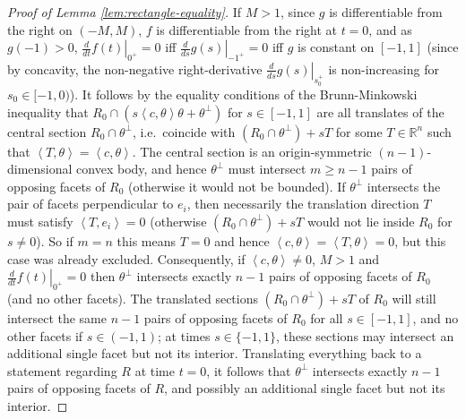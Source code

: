 \documentclass[11pt]{article}
\theoremstyle{definition}
\theoremstyle{proof}
\newcommand{\dsa}[2]{\left . \frac{d}{ds} #1 \right |_{#2^+}}
\newcommand{\dt}[1]{\left . \frac{d}{dt} #1 \right |_{0^+}}
\DeclareMathOperator{\+}{\mathop{\tilde{+}}}
\newcommand{\scalar}[1]{\left \langle #1 \right \rangle}
\newcommand{\R}{\mathbb{R}}
\numberwithin{equation}{section}
\numberwithin{equation}{section}
\begin{document}
\begin{proof}[Proof of Lemma \ref{lem:rectangle-equality}]
If $M > 1$, since $g$ is differentiable from the right on $(-M,M)$, 
$f$ is differentiable from the right at $t=0$, and as $g(-1) > 0$, $\dt{f(t)} =0$ iff $\dsa{g(s)}{-1}=0$ iff $g$ is constant on $[-1,1]$ (since by concavity, the non-negative right-derivative $\dsa{g(s)}{s_0}$ is non-increasing for $s_0 \in [-1,0)$). It follows by the equality conditions of the Brunn-Minkowski inequality that $R_0 \cap (s \scalar{c,\theta} \theta + \theta^{\perp})$ for $s \in [-1,1]$ are all translates of the central section $R_0 \cap \theta^{\perp}$, i.e.~coincide with $(R_0 \cap \theta^{\perp}) + s T$ for some $T \in \R^n$ such that $\scalar{T,\theta} = \scalar{c,\theta}$.
The central section is an origin-symmetric $(n-1)$-dimensional convex body, and hence $\theta^{\perp}$ must intersect $m \geq n-1$ pairs of opposing facets of $R_0$ (otherwise it would not be bounded). If $\theta^{\perp}$ intersects the pair of facets perpendicular to $e_i$, then necessarily the translation direction $T$ must satisfy $\scalar{T,e_i} = 0$ (otherwise $(R_0 \cap \theta^{\perp}) + s T$ would not lie inside $R_0$ for $s \neq 0$). So if $m=n$ this means $T=0$ and hence $\scalar{c,\theta}=\scalar{T,\theta} = 0$, but this case was already excluded. Consequently, if $\scalar{c,\theta}\neq 0$, $M > 1$ and $\dt{f(t)} =0$ then $\theta^{\perp}$ intersects exactly $n-1$ pairs of opposing facets of $R_0$ (and no other facets). The translated sections $(R_0 \cap \theta^{\perp}) + s T$ of $R_0$ will still intersect the same $n-1$ pairs of opposing facets of $R_0$ for all $s \in [-1,1]$, and no other facets if $s \in (-1,1)$; at times $s \in \{-1,1\}$, these sections may intersect an additional single facet but not its interior. 
Translating everything back to a statement regarding $R$ at time $t=0$, it follows that $\theta^{\perp}$ intersects exactly $n-1$ pairs of opposing facets of $R$, and possibly an additional single facet but not its interior. 


\end{proof}
\end{document}
